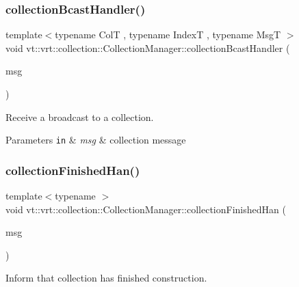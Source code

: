 \subsubsection{\texorpdfstring{collection\+Bcast\+Handler()}{collectionBcastHandler()}}
{\footnotesize\ttfamily template$<$typename ColT , typename IndexT , typename MsgT $>$ \\
void vt\+::vrt\+::collection\+::\+Collection\+Manager\+::collection\+Bcast\+Handler (\begin{DoxyParamCaption}\item[{MsgT $\ast$}]{msg }\end{DoxyParamCaption})\hspace{0.3cm}{\ttfamily [static]}}



Receive a broadcast to a collection. 


\begin{DoxyParams}[1]{Parameters}
\mbox{\tt in}  & {\em msg} & collection message \\
\hline
\end{DoxyParams}
\mbox{\label{structvt_1_1vrt_1_1collection_1_1_collection_manager_ad56b5d61a3f1a8286e21076a274dcf17}} 
\subsubsection{\texorpdfstring{collection\+Finished\+Han()}{collectionFinishedHan()}}
{\footnotesize\ttfamily template$<$typename $>$ \\
void vt\+::vrt\+::collection\+::\+Collection\+Manager\+::collection\+Finished\+Han (\begin{DoxyParamCaption}\item[{\hyperlink{structvt_1_1vrt_1_1collection_1_1_collection_cons_msg}{Collection\+Cons\+Msg} $\ast$}]{msg }\end{DoxyParamCaption})\hspace{0.3cm}{\ttfamily [static]}}



Inform that collection has finished construction. 


